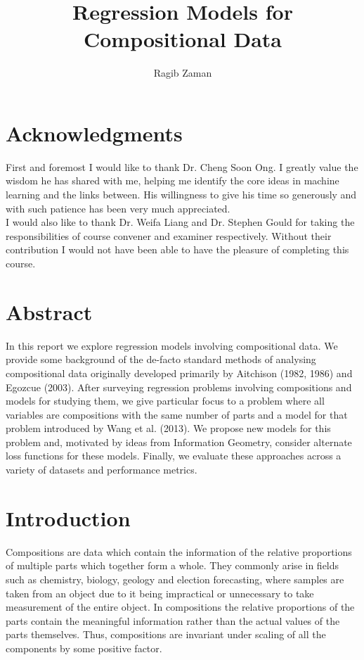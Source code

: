 \documentclass[BSc]{usydthesis}
\author{Ragib Zaman}
\title{Regression Models for Compositional Data}
\numberwithin{equation}{chapter}
\theoremstyle{remark}
\begin{document}
  


\maketitle          %

\chapter*{Acknowledgments}
First and foremost I would like to thank Dr. Cheng Soon Ong. I greatly value the wisdom he has shared with me, helping me identify the core ideas in machine learning and the links between. His willingness to give his time so generously and with such patience has been very much appreciated.\\

I would also like to thank Dr. Weifa Liang and Dr. Stephen Gould for taking the responsibilities of course convener and examiner respectively. Without their contribution I would not have been able to have the pleasure of completing this course. 

\chapter*{Abstract}
In this report we explore regression models involving compositional data. We provide some background of the de-facto standard methods of analysing compositional data originally developed primarily by Aitchison (1982, 1986) and Egozcue (2003). After surveying regression problems involving compositions and models for studying them, we give particular focus to a problem where all variables are compositions with the same number of parts and a model for that problem introduced by Wang et al. (2013). We propose new models for this problem and, motivated by ideas from Information Geometry, consider alternate loss functions for these models. Finally, we evaluate these approaches across a variety of datasets and performance metrics.\\ 



\tableofcontents    %

\newpage\setcounter{page}{1}

\chapter{Introduction}
Compositions are data which contain the information of the relative proportions of multiple parts which together form a whole. They commonly arise in fields such as chemistry, biology, geology and election forecasting, where samples are taken from an object due to it being impractical or unnecessary to take measurement of the entire object. In compositions the relative proportions of the parts contain the meaningful information rather than the actual values of the parts themselves. Thus, compositions are invariant under scaling of all the components by some positive factor.\\
\end{document}
